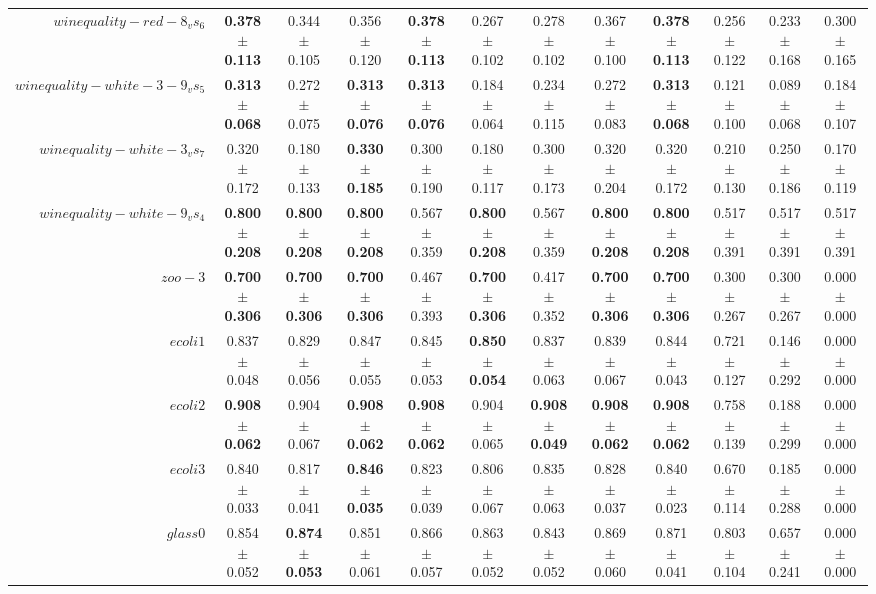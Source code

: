 \begin{table}[!ht]
{\begin{tabular}{r c c c c c c c c c c c}
$winequality-red-8_vs_6$ & \textbf{0.378 $\pm$ 0.113} & 0.344 $\pm$ 0.105 & 0.356 $\pm$ 0.120 & \textbf{0.378 $\pm$ 0.113} & 0.267 $\pm$ 0.102 & 0.278 $\pm$ 0.102 & 0.367 $\pm$ 0.100 & \textbf{0.378 $\pm$ 0.113} & 0.256 $\pm$ 0.122 & 0.233 $\pm$ 0.168 & 0.300 $\pm$ 0.165 \\
$winequality-white-3-9_vs_5$ & \textbf{0.313 $\pm$ 0.068} & 0.272 $\pm$ 0.075 & \textbf{0.313 $\pm$ 0.076} & \textbf{0.313 $\pm$ 0.076} & 0.184 $\pm$ 0.064 & 0.234 $\pm$ 0.115 & 0.272 $\pm$ 0.083 & \textbf{0.313 $\pm$ 0.068} & 0.121 $\pm$ 0.100 & 0.089 $\pm$ 0.068 & 0.184 $\pm$ 0.107 \\
$winequality-white-3_vs_7$ & 0.320 $\pm$ 0.172 & 0.180 $\pm$ 0.133 & \textbf{0.330 $\pm$ 0.185} & 0.300 $\pm$ 0.190 & 0.180 $\pm$ 0.117 & 0.300 $\pm$ 0.173 & 0.320 $\pm$ 0.204 & 0.320 $\pm$ 0.172 & 0.210 $\pm$ 0.130 & 0.250 $\pm$ 0.186 & 0.170 $\pm$ 0.119 \\
$winequality-white-9_vs_4$ & \textbf{0.800 $\pm$ 0.208} & \textbf{0.800 $\pm$ 0.208} & \textbf{0.800 $\pm$ 0.208} & 0.567 $\pm$ 0.359 & \textbf{0.800 $\pm$ 0.208} & 0.567 $\pm$ 0.359 & \textbf{0.800 $\pm$ 0.208} & \textbf{0.800 $\pm$ 0.208} & 0.517 $\pm$ 0.391 & 0.517 $\pm$ 0.391 & 0.517 $\pm$ 0.391 \\
$zoo-3$ & \textbf{0.700 $\pm$ 0.306} & \textbf{0.700 $\pm$ 0.306} & \textbf{0.700 $\pm$ 0.306} & 0.467 $\pm$ 0.393 & \textbf{0.700 $\pm$ 0.306} & 0.417 $\pm$ 0.352 & \textbf{0.700 $\pm$ 0.306} & \textbf{0.700 $\pm$ 0.306} & 0.300 $\pm$ 0.267 & 0.300 $\pm$ 0.267 & 0.000 $\pm$ 0.000 \\
$ecoli1$ & 0.837 $\pm$ 0.048 & 0.829 $\pm$ 0.056 & 0.847 $\pm$ 0.055 & 0.845 $\pm$ 0.053 & \textbf{0.850 $\pm$ 0.054} & 0.837 $\pm$ 0.063 & 0.839 $\pm$ 0.067 & 0.844 $\pm$ 0.043 & 0.721 $\pm$ 0.127 & 0.146 $\pm$ 0.292 & 0.000 $\pm$ 0.000 \\
$ecoli2$ & \textbf{0.908 $\pm$ 0.062} & 0.904 $\pm$ 0.067 & \textbf{0.908 $\pm$ 0.062} & \textbf{0.908 $\pm$ 0.062} & 0.904 $\pm$ 0.065 & \textbf{0.908 $\pm$ 0.049} & \textbf{0.908 $\pm$ 0.062} & \textbf{0.908 $\pm$ 0.062} & 0.758 $\pm$ 0.139 & 0.188 $\pm$ 0.299 & 0.000 $\pm$ 0.000 \\
$ecoli3$ & 0.840 $\pm$ 0.033 & 0.817 $\pm$ 0.041 & \textbf{0.846 $\pm$ 0.035} & 0.823 $\pm$ 0.039 & 0.806 $\pm$ 0.067 & 0.835 $\pm$ 0.063 & 0.828 $\pm$ 0.037 & 0.840 $\pm$ 0.023 & 0.670 $\pm$ 0.114 & 0.185 $\pm$ 0.288 & 0.000 $\pm$ 0.000 \\
$glass0$ & 0.854 $\pm$ 0.052 & \textbf{0.874 $\pm$ 0.053} & 0.851 $\pm$ 0.061 & 0.866 $\pm$ 0.057 & 0.863 $\pm$ 0.052 & 0.843 $\pm$ 0.052 & 0.869 $\pm$ 0.060 & 0.871 $\pm$ 0.041 & 0.803 $\pm$ 0.104 & 0.657 $\pm$ 0.241 & 0.000 $\pm$ 0.000 \\

\end{tabular}}
\end{table}
